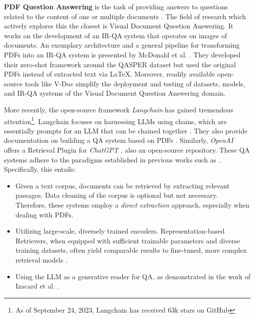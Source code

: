 \textbf{PDF Question Answering} is the task of providing answers to questions related to the content of one or multiple documents \cite{mathew_document_2021}. The field of research which actively explores this the closest is Visual Document Question Answering. It works on the development of an IR-QA system that operates on images of documents. An exemplary architecture and a general pipeline for transforming PDFs into an IR-QA system is presented by McDonald et al. \cite{mcdonald_detect_2022}. They developed their zero-shot framework around the QASPER dataset but used the original PDFs instead of extracted text via LaTeX. Moreover, readily available open-source tools like V-Doc \cite{ding_v-doc_2022} simplify the deployment and testing of datasets, models, and IR-QA systems of the Visual Document Question Answering domain.

More recently, the open-source framework \textit{Langchain} has gained tremendous attention\footnote{As of September 24, 2023, Langchain has received 63k stars on GitHub}. Langchain focuses on harnessing LLMs using chains, which are essentially prompts for an LLM that can be chained together \cite{noauthor_langchain-ailangchain_nodate}. They also provide documentation on building a QA system based on PDFs \cite{noauthor_question_nodate}. Similarly, \textit{OpenAI} offers a Retrieval Plugin for \textit{ChatGPT} \cite{noauthor_chatgpt_2023}, also an open-source repository. These QA systems adhere to the paradigms established in previous works such as \cite{karpukhin_dense_2020,ni_large_2021,neelakantan_text_2022,lewis_retrieval-augmented_2021}. Specifically, this entails:

\begin{itemize}
    \item Given a text corpus, documents can be retrieved by extracting relevant passages. Data cleaning of the corpus is optional but not necessary. Therefore, these systems employ a \textit{direct extraction} approach, especially when dealing with PDFs.
    \item Utilizing large-scale, diversely trained encoders. Representation-based Retrievers, when equipped with sufficient trainable parameters and diverse training datasets, often yield comparable results to fine-tuned, more complex retrieval models \cite{ni_large_2021,neelakantan_text_2022}.
    \item Using the LLM as a generative reader for QA, as demonstrated in the work of Izacard et al. \cite{izacard_leveraging_2021}.
\end{itemize}

